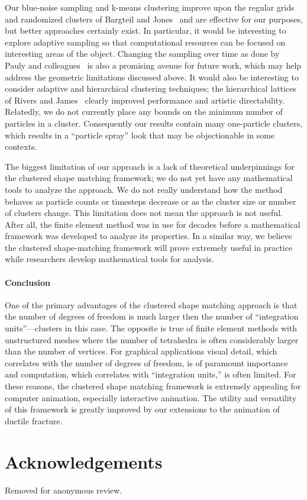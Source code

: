 \documentclass[review]{acmsiggraph}
\begin{document}
Our blue-noise sampling and k-means clustering improve upon the regular grids and
randomized clusters of Bargteil and Jones~ and are effective for our purposes,
but better approaches certainly exist.  In particular, it would be interesting to explore adaptive sampling
so that computational resources can be focused on interesting areas of the object.  
Changing the sampling over time as done by Pauly and colleagues~
is also a promising avenue for future work, which may help address the geometric limitations discussed above.
It would also be interesting
to consider adaptive and hierarchical clustering techniques; the hierarchical lattices of Rivers and James~\cite{Rivers:2007:FFL}
clearly improved performance and artistic directability.  Relatedly, we do not currently place any bounds on the minimum
number of particles in a cluster.  Consequently our results contain many one-particle clusters, which results in a 
``particle spray'' look that may be objectionable in some contexts.

The biggest limitation of our approach is a lack of theoretical underpinnings for the clustered shape matching
framework; we do not yet have any mathematical tools to analyze the approach.  We do not really understand
how the method behaves as particle counts or timesteps decrease or as the cluster size or number of clusters change.
This limitation does not mean the approach is not useful.  After all, the finite element method was in use
for decades before a mathematical framework was developed to analyze its properties.  In a similar way,
we believe the clustered shape-matching framework will prove extremely useful in practice while
researchers develop mathematical tools for analysis. 

\paragraph{Conclusion} 
One of the primary advantages of the clustered shape matching approach is that the number of degrees of freedom
is much larger then the number of ``integration units''---clusters in this case.  The opposite is true of finite element
methods with unstructured meshes where the number of tetrahedra is often considerably larger than the number of vertices.  
For graphical applications visual detail, which correlates with the number of degrees of freedom, is of paramount importance
and computation, which correlates with ``integration units,'' is often limited.  
For these reasons, the clustered shape matching framework is extremely appealing for computer animation, 
especially interactive animation.  The utility and versatility of this framework is greatly improved by our extensions 
to the animation of ductile fracture.




\section*{Acknowledgements}
Removed for anonymous review.



\end{document}
